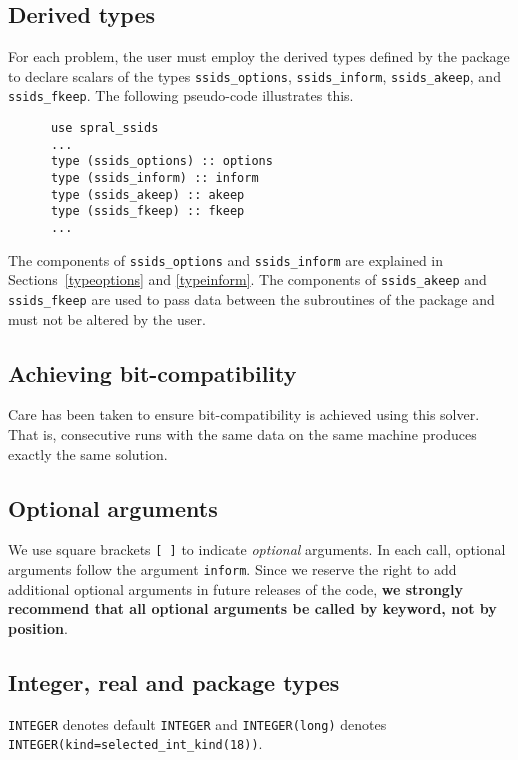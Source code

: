 \documentclass{spral}
\begin{document}

\subsection{Derived types} \label{derived types}

For each problem, the user must employ the derived types defined by the
package to declare scalars of the types
{\tt ssids\_options}, {\tt ssids\_inform}, {\tt ssids\_akeep}, and {\tt ssids\_fkeep}.
The following pseudo-code illustrates this.
\begin{verbatim}
      use spral_ssids
      ...
      type (ssids_options) :: options
      type (ssids_inform) :: inform
      type (ssids_akeep) :: akeep
      type (ssids_fkeep) :: fkeep
      ...
\end{verbatim}
The components of {\tt ssids\_options} and {\tt ssids\_inform} are explained
in Sections~\ref{typeoptions} and \ref{typeinform}.
The components of {\tt ssids\_akeep} and {\tt ssids\_fkeep} are used to pass
data between the subroutines of the package and must not be altered by the user.

\subsection{Achieving bit-compatibility} \label{bitcompat}
Care has been taken to ensure bit-compatibility is achieved using this solver.
That is, consecutive runs with the same data on the same machine  produces exactly
the same solution.

\subsection{Optional arguments}\label{Optional arguments}

We use square brackets {\tt [ ]} to indicate {\it optional} arguments.
In each
call, optional arguments follow the argument {\tt inform}.  Since we
reserve the right to add additional optional arguments in future
releases of the code, {\bf we strongly recommend that all optional
arguments be called by keyword, not by position}.

\subsection{Integer, real and package types}\label{Integer kinds}

{\tt INTEGER} denotes default {\tt INTEGER} and
{\tt INTEGER(long)} denotes {\tt INTEGER(kind=selected\_int\_kind(18))}.
\end{document}
